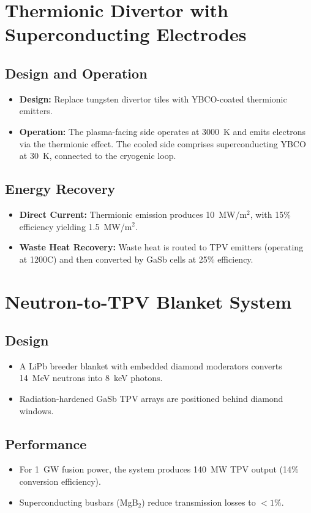 \documentclass[12pt]{article}
\begin{document}
\section{Thermionic Divertor with Superconducting Electrodes}
\subsection{Design and Operation}
\begin{itemize}
    \item \textbf{Design:} Replace tungsten divertor tiles with YBCO-coated thermionic emitters.
    \item \textbf{Operation:} The plasma-facing side operates at 3000~K and emits electrons via the thermionic effect. The cooled side comprises superconducting YBCO at 30~K, connected to the cryogenic loop.
\end{itemize}

\subsection{Energy Recovery}
\begin{itemize}
    \item \textbf{Direct Current:} Thermionic emission produces 10~MW/m$^2$, with 15\% efficiency yielding 1.5~MW/m$^2$.
    \item \textbf{Waste Heat Recovery:} Waste heat is routed to TPV emitters (operating at 1200\textdegree C) and then converted by GaSb cells at 25\% efficiency.
\end{itemize}

\section{Neutron-to-TPV Blanket System}
\subsection{Design}
\begin{itemize}
    \item A LiPb breeder blanket with embedded diamond moderators converts 14~MeV neutrons into 8~keV photons.
    \item Radiation-hardened GaSb TPV arrays are positioned behind diamond windows.
\end{itemize}

\subsection{Performance}
\begin{itemize}
    \item For 1~GW fusion power, the system produces 140~MW TPV output (14\% conversion efficiency).
    \item Superconducting busbars (MgB$_2$) reduce transmission losses to $<1\%$.
\end{itemize}
\end{document}
